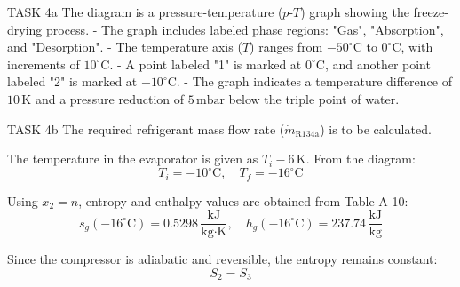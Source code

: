 TASK 4a  
The diagram is a pressure-temperature (\( p \)-\( T \)) graph showing the freeze-drying process.  
- The graph includes labeled phase regions: "Gas", "Absorption", and "Desorption".  
- The temperature axis (\( T \)) ranges from \(-50^\circ\text{C}\) to \( 0^\circ\text{C}\), with increments of \( 10^\circ\text{C} \).  
- A point labeled "1" is marked at \( 0^\circ\text{C} \), and another point labeled "2" is marked at \(-10^\circ\text{C}\).  
- The graph indicates a temperature difference of \( 10 \, \text{K} \) and a pressure reduction of \( 5 \, \text{mbar} \) below the triple point of water.  

TASK 4b  
The required refrigerant mass flow rate (\( \dot{m}_{\text{R134a}} \)) is to be calculated.  

The temperature in the evaporator is given as \( T_i - 6 \, \text{K} \).  
From the diagram:  
\[
T_i = -10^\circ\text{C}, \quad T_f = -16^\circ\text{C}
\]  

Using \( x_2 = n \), entropy and enthalpy values are obtained from Table A-10:  
\[
s_g(-16^\circ\text{C}) = 0.5298 \, \frac{\text{kJ}}{\text{kg·K}}, \quad h_g(-16^\circ\text{C}) = 237.74 \, \frac{\text{kJ}}{\text{kg}}
\]  

Since the compressor is adiabatic and reversible, the entropy remains constant:  
\[
S_2 = S_3
\]